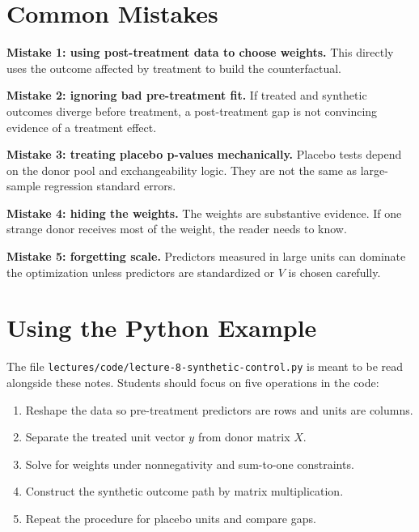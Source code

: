 \section{Common Mistakes}

\begin{boxD}
\textbf{Mistake 1: using post-treatment data to choose weights.} This directly uses the outcome affected by treatment to build the counterfactual.
\end{boxD}

\begin{boxD}
\textbf{Mistake 2: ignoring bad pre-treatment fit.} If treated and synthetic outcomes diverge before treatment, a post-treatment gap is not convincing evidence of a treatment effect.
\end{boxD}

\begin{boxD}
\textbf{Mistake 3: treating placebo p-values mechanically.} Placebo tests depend on the donor pool and exchangeability logic. They are not the same as large-sample regression standard errors.
\end{boxD}

\begin{boxD}
\textbf{Mistake 4: hiding the weights.} The weights are substantive evidence. If one strange donor receives most of the weight, the reader needs to know.
\end{boxD}

\begin{boxD}
\textbf{Mistake 5: forgetting scale.} Predictors measured in large units can dominate the optimization unless predictors are standardized or \(V\) is chosen carefully.
\end{boxD}

\section{Using the Python Example}

The file \texttt{lectures/code/lecture-8-synthetic-control.py} is meant to be read alongside these notes. Students should focus on five operations in the code:

\begin{enumerate}
\item Reshape the data so pre-treatment predictors are rows and units are columns.
\item Separate the treated unit vector \(y\) from donor matrix \(X\).
\item Solve for weights under nonnegativity and sum-to-one constraints.
\item Construct the synthetic outcome path by matrix multiplication.
\item Repeat the procedure for placebo units and compare gaps.
\end{enumerate}

